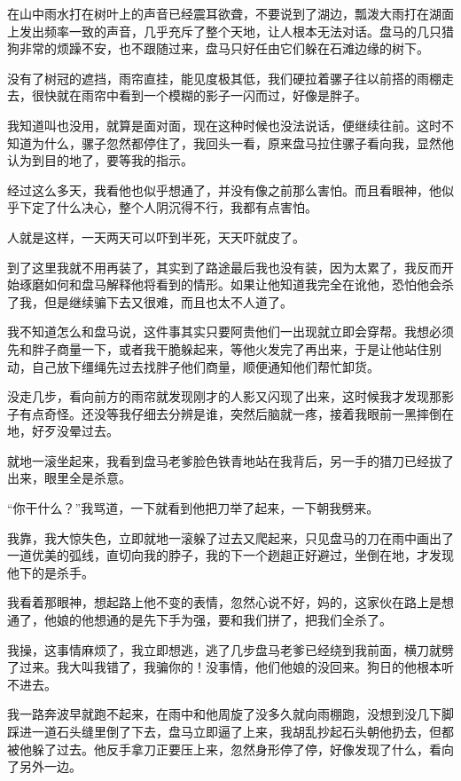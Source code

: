 在山中雨水打在树叶上的声音已经震耳欲聋，不要说到了湖边，瓢泼大雨打在湖面上发出频率一致的声音，几乎充斥了整个天地，让人根本无法对话。盘马的几只猎狗非常的烦躁不安，也不跟随过来，盘马只好任由它们躲在石滩边缘的树下。

没有了树冠的遮挡，雨帘直挂，能见度极其低，我们硬拉着骡子往以前搭的雨棚走去，很快就在雨帘中看到一个模糊的影子一闪而过，好像是胖子。

我知道叫也没用，就算是面对面，现在这种时候也没法说话，便继续往前。这时不知道为什么，骡子忽然都停住了，我回头一看，原来盘马拉住骡子看向我，显然他认为到目的地了，要等我的指示。

经过这么多天，我看他也似乎想通了，并没有像之前那么害怕。而且看眼神，他似乎下定了什么决心，整个人阴沉得不行，我都有点害怕。

人就是这样，一天两天可以吓到半死，天天吓就皮了。

到了这里我就不用再装了，其实到了路途最后我也没有装，因为太累了，我反而开始琢磨如何和盘马解释他将看到的情形。如果让他知道我完全在讹他，恐怕他会杀了我，但是继续骗下去又很难，而且也太不人道了。

我不知道怎么和盘马说，这件事其实只要阿贵他们一出现就立即会穿帮。我想必须先和胖子商量一下，或者我干脆躲起来，等他火发完了再出来，于是让他站住别动，自己放下缰绳先过去找胖子他们商量，顺便通知他们帮忙卸货。

没走几步，看向前方的雨帘就发现刚才的人影又闪现了出来，这时候我才发现那影子有点奇怪。还没等我仔细去分辨是谁，突然后脑就一疼，接着我眼前一黑摔倒在地，好歹没晕过去。

就地一滚坐起来，我看到盘马老爹脸色铁青地站在我背后，另一手的猎刀已经拔了出来，眼里全是杀意。

“你干什么？”我骂道，一下就看到他把刀举了起来，一下朝我劈来。

我靠，我大惊失色，立即就地一滚躲了过去又爬起来，只见盘马的刀在雨中画出了一道优美的弧线，直切向我的脖子，我的下一个趔趄正好避过，坐倒在地，才发现他下的是杀手。

我看着那眼神，想起路上他不变的表情，忽然心说不好，妈的，这家伙在路上是想通了，他娘的他想通的是先下手为强，要和我们拼了，把我们全杀了。

我操，这事情麻烦了，我立即想逃，逃了几步盘马老爹已经绕到我前面，横刀就劈了过来。我大叫我错了，我骗你的！没事情，他们他娘的没回来。狗日的他根本听不进去。

我一路奔波早就跑不起来，在雨中和他周旋了没多久就向雨棚跑，没想到没几下脚踩进一道石头缝里倒了下去，盘马立即逼了上来，我胡乱抄起石头朝他扔去，但都被他躲了过去。他反手拿刀正要压上来，忽然身形停了停，好像发现了什么，看向了另外一边。

